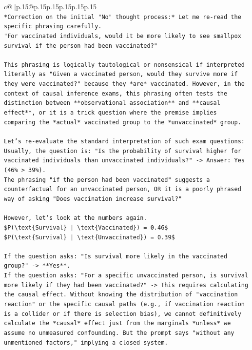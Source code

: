 \documentclass{article}
\begin{document}
{\begin{supertabular}{c@{$\;$}|p{.15\linewidth}@{}p{.15\linewidth}p{.15\linewidth}p{.15\linewidth}p{.15\linewidth}p{.15\linewidth}}
{{{\\ 
\texttt{*Correction on the initial "No" thought process:* Let me re{-}read the specific phrasing carefully.} \\
\texttt{"For vaccinated individuals, would it be more likely to see smallpox survival if the person had been vaccinated?"} \\
\\ 
\texttt{This phrasing is logically tautological or nonsensical if interpreted literally as "Given a vaccinated person, would they survive more if they were vaccinated?" because they *are* vaccinated. However, in the context of causal inference exams, this phrasing often tests the distinction between **observational association** and **causal effect**, or it is a trick question where the premise implies comparing the *actual* vaccinated group to the *unvaccinated* group.} \\
\\ 
\texttt{Let's re{-}evaluate the standard interpretation of such exam questions:} \\
\texttt{Usually, the question is: "Is the probability of survival higher for vaccinated individuals than unvaccinated individuals?" {-}> Answer: Yes (46\% > 39\%).} \\
\texttt{The phrasing "if the person had been vaccinated" suggests a counterfactual for an unvaccinated person, OR it is a poorly phrased way of asking "Does vaccination increase survival?"} \\
\\ 
\texttt{However, let's look at the numbers again.} \\
\texttt{\$P(\textbackslash{}text\{Survival\} | \textbackslash{}text\{Vaccinated\}) = 0.46\$} \\
\texttt{\$P(\textbackslash{}text\{Survival\} | \textbackslash{}text\{Unvaccinated\}) = 0.39\$} \\
\\ 
\texttt{If the question asks: "Is survival more likely in the vaccinated group?" {-}> **Yes**.} \\
\texttt{If the question asks: "For a specific unvaccinated person, is survival more likely if they had been vaccinated?" {-}> This requires calculating the causal effect. Without knowing the distribution of "vaccination reaction" or the specific causal paths (e.g., if vaccination reaction is a collider or if there is selection bias), we cannot definitively calculate the *causal* effect just from the marginals *unless* we assume no unmeasured confounding. But the prompt says "without any unmentioned factors," implying a closed system.} \\
}}}
\end{supertabular}}
\end{document}
